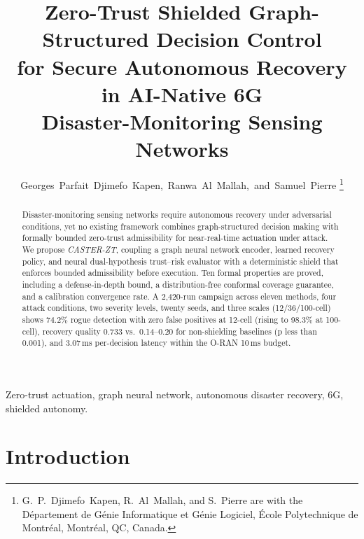 \documentclass[lettersize,journal]{IEEEtran}
\begin{document}

\title{Zero-Trust Shielded Graph-Structured Decision Control\\ for Secure Autonomous Recovery in AI-Native 6G\\ Disaster-Monitoring Sensing Networks}

\author{Georges~Parfait~Djimefo~Kapen,~Ranwa~Al~Mallah,~and~Samuel~Pierre%
\thanks{G.~P.~Djimefo~Kapen, R.~Al~Mallah, and S.~Pierre are with the D\'{e}partement de G\'{e}nie Informatique et G\'{e}nie Logiciel, \'{E}cole Polytechnique de Montr\'{e}al, Montr\'{e}al, QC, Canada.}%
}

\maketitle

\begin{abstract}
Disaster-monitoring sensing networks require autonomous recovery under adversarial conditions, yet no existing framework combines graph-structured decision making with formally bounded zero-trust admissibility for near-real-time actuation under attack.
We propose \emph{CASTER-ZT}, coupling a graph neural network encoder, learned recovery policy, and neural dual-hypothesis trust--risk evaluator with a deterministic shield that enforces bounded admissibility before execution.
Ten formal properties are proved, including a defense-in-depth bound, a distribution-free conformal coverage guarantee, and a calibration convergence rate.
A 2,420-run campaign across eleven methods, four attack conditions, two severity levels, twenty seeds, and three scales (12/36/100-cell) shows 74.2\% rogue detection with zero false positives at 12-cell (rising to 98.3\% at 100-cell), recovery quality 0.733 vs.\ 0.14--0.20 for non-shielding baselines (p less than 0.001), and 3.07\,ms per-decision latency within the O-RAN 10\,ms budget.
\end{abstract}

\begin{IEEEkeywords}
Zero-trust actuation, graph neural network, autonomous disaster recovery, 6G, shielded autonomy.
\end{IEEEkeywords}


\section{Introduction}
\label{sec:introduction}
\end{document}
